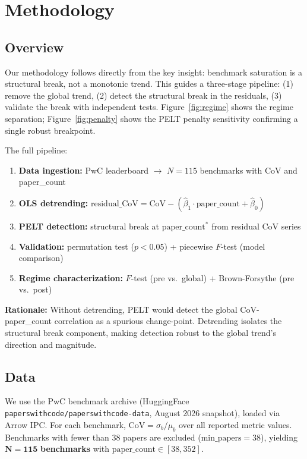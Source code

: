 \section{Methodology}
\label{sec:method}

\subsection{Overview}

Our methodology follows directly from the key insight: benchmark saturation is a structural break, not a monotonic trend. This guides a three-stage pipeline: (1) remove the global trend, (2) detect the structural break in the residuals, (3) validate the break with independent tests. Figure~\ref{fig:regime} shows the regime separation; Figure~\ref{fig:penalty} shows the PELT penalty sensitivity confirming a single robust breakpoint.

The full pipeline:
\begin{enumerate}
\item[\textbf{(i)}] \textbf{Data ingestion:} PwC leaderboard $\to$ $N=115$ benchmarks with CoV and paper\_count
\item[\textbf{(ii)}] \textbf{OLS detrending:} $\text{residual\_CoV} = \text{CoV} - (\hat{\beta}_1 \cdot \text{paper\_count} + \hat{\beta}_0)$
\item[\textbf{(iii)}] \textbf{PELT detection:} structural break at $\text{paper\_count}^*$ from residual CoV series
\item[\textbf{(iv)}] \textbf{Validation:} permutation test ($p < 0.05$) + piecewise $F$-test (model comparison)
\item[\textbf{(v)}] \textbf{Regime characterization:} $F$-test (pre vs.\ global) + Brown-Forsythe (pre vs.\ post)
\end{enumerate}

\textbf{Rationale:} Without detrending, PELT would detect the global CoV-paper\_count correlation as a spurious change-point. Detrending isolates the structural break component, making detection robust to the global trend's direction and magnitude.

\subsection{Data}

We use the PwC benchmark archive (HuggingFace \texttt{paperswithcode/paperswithcode-data}, August 2026 snapshot), loaded via Arrow IPC. For each benchmark, $\text{CoV} = \sigma_b / \mu_b$ over all reported metric values. Benchmarks with fewer than 38 papers are excluded ($\text{min\_papers}=38$), yielding $\mathbf{N=115}$ \textbf{benchmarks} with $\text{paper\_count} \in [38, 352]$.

